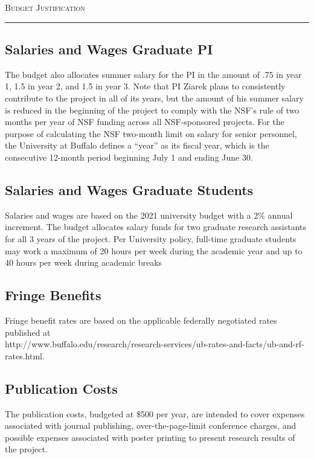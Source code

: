 




\begin{center}
{\LARGE \textsc{Budget Justification}}
\end{center}
\hrule
\vspace{3mm}


\subsection*{Salaries and Wages Graduate PI}
The budget also
allocates summer salary for the PI in the amount of .75 in year 1, 1.5 in year 2, and 1.5 in year 3.
 Note that PI Ziarek plans to
consistently contribute to the project in all of its years, but the
amount of his summer salary is reduced in the beginning of the project to
comply with the NSF's rule of two months per year of NSF funding across all
NSF-sponsored projects.
For the purpose of calculating the NSF two-month limit on salary for senior personnel, the University at Buffalo defines a ``year'' as its fiscal year, which is the consecutive 12-month period beginning July 1 and ending June 30.


\subsection*{Salaries and Wages Graduate Students}
Salaries and wages are based on the 2021 university budget with a 2\%
annual increment.
The budget allocates salary funds for two graduate
research assistants for all 3 years of the project. 
Per University policy, full-time graduate students may work a maximum of 20 hours per week during the academic year and up to 40 hours per week during academic breaks



\subsection*{Fringe Benefits}

Fringe benefit rates are based on the applicable federally negotiated rates
published at\\ 
http://www.buffalo.edu/research/research-services/ub-rates-and-facts/ub-and-rf-rates.html.


\subsection*{Publication Costs}
The publication costs, budgeted at
\$500 per year, are intended to cover expenses associated with journal
publishing, over-the-page-limit conference charges, and possible
expenses associated with poster printing to present research results of the
project.



